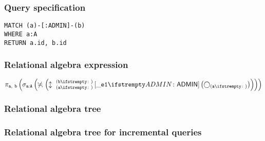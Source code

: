 \subsubsection*{Query specification}

\begin{lstlisting}
MATCH (a)-[:ADMIN]-(b)
WHERE a:A
RETURN a.id, b.id
\end{lstlisting}

\subsubsection*{Relational algebra expression}

$\projection{\var{a},~\var{b}} \left(\selection{\mathtt{a:A}} \left(\alldifferent{} \left(\expandboth{a}{b}{}{\_e1}{ADMIN} \left(\getvertices{a}{}\right)\right)\right)\right)$

\subsubsection*{Relational algebra tree}


\subsubsection*{Relational algebra tree for incremental queries}


